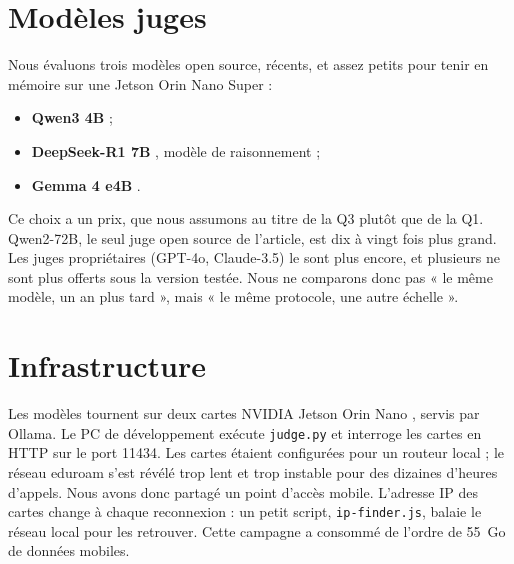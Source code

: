 \section{Modèles juges}

Nous évaluons trois modèles open source, récents, et assez petits pour tenir en mémoire sur une Jetson Orin Nano Super :

\begin{itemize}[leftmargin=1.6em]
  \item \textbf{Qwen3 4B} \cite{qwen3technical,ollamaqwen3} ;
  \item \textbf{DeepSeek-R1 7B} \cite{deepseekr1,ollamadeepseek}, modèle de raisonnement ;
  \item \textbf{Gemma 4 e4B} \cite{ollamagemma4}.
\end{itemize}

Ce choix a un prix, que nous assumons au titre de la Q3 plutôt que de la Q1. Qwen2-72B, le seul juge open source de l'article, est dix à vingt fois plus grand. Les juges propriétaires (GPT-4o, Claude-3.5) le sont plus encore, et plusieurs ne sont plus offerts sous la version testée. Nous ne comparons donc pas « le même modèle, un an plus tard », mais « le même protocole, une autre échelle ».

\section{Infrastructure}

Les modèles tournent sur deux cartes NVIDIA Jetson Orin Nano \cite{jetsonorin}, servis par Ollama. Le PC de développement exécute \texttt{judge.py} et interroge les cartes en HTTP sur le port 11434. Les cartes étaient configurées pour un routeur local ; le réseau eduroam s'est révélé trop lent et trop instable pour des dizaines d'heures d'appels. Nous avons donc partagé un point d'accès mobile. L'adresse IP des cartes change à chaque reconnexion : un petit script, \texttt{ip-finder.js}, balaie le réseau local pour les retrouver. Cette campagne a consommé de l'ordre de 55~Go de données mobiles.


